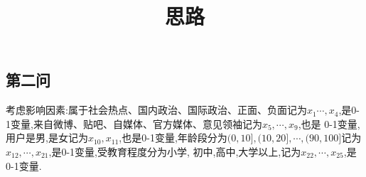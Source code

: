 \documentclass[12pt,a4paper,oneside]{ctexart}
\title{思路}
\date{}
\author{}
\begin{document}
  \maketitle

  \subsection*{第二问}
  
  考虑影响因素:属于社会热点、国内政治、国际政治、正面、负面记为$x_1\cdots,x_4$,是0-1变量,来自微博、贴吧、自媒体、官方媒体、意见领袖记为$x_5,\cdots,x_9$,也是 
  0-1变量,用户是男,是女记为$x_{10},x_{11}$,也是0-1变量,年龄段分为$(0,10],(10,20],\cdots,(90,100]$记为$x_{12},\cdots,x_{21}$,是0-1变量,受教育程度分为小学,
  初中,高中,大学以上,记为$x_{22},\cdots,x_{25}$,是0-1变量.
\end{document}
